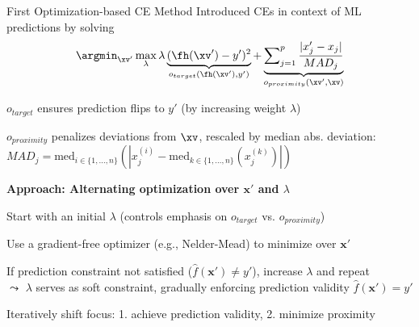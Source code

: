 \documentclass[10pt,compress,t,notes=noshow,xcolor=table]{beamer}
\begin{document}
\begin{framev}[align=top]{First Optimization-based CE Method }
Introduced CEs in context of ML predictions by solving
$$
\argmin_{\xv'} \max_{\lambda} \lambda \underbrace{(\fh(\xv') - y')^2}_{o_{target}(\fh(\xv'), y')} + \underbrace{\sum\nolimits_{j = 1}^p \frac{|x'_j - x_j|}{MAD_j}}_{o_{proximity}(\xv', \xv)}
$$
\begin{itemizeM}
\item $o_{target}$ ensures prediction flips to $y'$ (by increasing weight $\lambda$)
\item $o_{proximity}$ penalizes deviations from $\xv$, rescaled by median abs. deviation: $MAD_j = \text{med}_{i \in \{1, \dots, n\}} ( | x^{(i)}_j - \text{med}_{k \in \{1, \dots, n\}} (x^{(k)}_j) | )$
\end{itemizeM}
\pause
\spacer[0.25]
\textbf{Approach: Alternating optimization over $\mathbf{x}'$ and $\lambda$}
\begin{itemizeM}
\item Start with an initial $\lambda$ (controls emphasis on $o_{target}$ vs. $o_{proximity}$)
\item Use a gradient-free optimizer (e.g., Nelder-Mead) to minimize over $\mathbf{x}'$
\item If prediction constraint not satisfied ($\hat{f}(\mathbf{x}') \ne y'$), increase $\lambda$ and repeat\\
$\leadsto$ $\lambda$ serves as soft constraint, gradually enforcing prediction validity $\hat{f}(\mathbf{x}') = y'$
\item Iteratively shift focus: 1. achieve prediction validity, 2. minimize proximity%
\end{itemizeM}

\end{framev}
\end{document}
